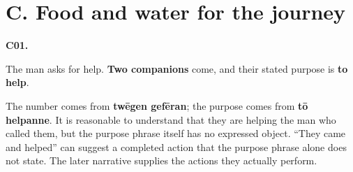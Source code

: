 \section*{C. Food and water for the journey}

\par\begin{minipage}{\linewidth}\raggedright
\textbf{C01.}

The man asks for help. \textbf{Two companions} come, and their stated purpose is \textbf{to help}.

The number comes from \textbf{twēgen gefēran}; the purpose comes from \textbf{tō helpanne}. It is reasonable to understand that they are helping the man who called them, but the purpose phrase itself has no expressed object. “They came and helped” can suggest a completed action that the purpose phrase alone does not state. The later narrative supplies the actions they actually perform.

\end{minipage}\par\addvspace{4pt}

